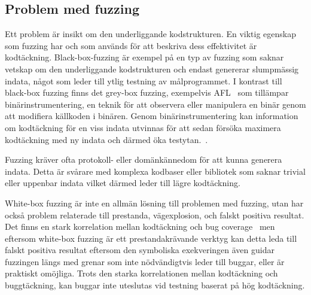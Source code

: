 \subsection{Problem med fuzzing} Ett problem är insikt om den underliggande
kodstrukturen. En viktig egenskap som fuzzing har och som används för att beskriva dess
effektivitet är kodtäckning. Black-box-fuzzing är exempel på en typ av fuzzing som
saknar vetskap om den underliggande kodstrukturen och endast genererar
slumpmässig indata, något som leder till ytlig testning av målprogrammet. I
kontrast till black-box fuzzing finns det grey-box fuzzing, exempelvis
AFL~\cite{aflplusplus} som tillämpar binärinstrumentering, en
teknik för att observera eller manipulera en binär genom att modifiera källkoden
i binären. Genom binärinstrumentering kan information om kodtäckning
för en viss indata utvinnas för att sedan försöka maximera kodtäckning med ny indata
och därmed öka testytan.~\cite{challenges_fuzzing}.


Fuzzing kräver ofta protokoll- eller domänkännedom för att kunna generera
indata. Detta är svårare med komplexa kodbaser eller bibliotek som saknar
trivial eller uppenbar indata vilket därmed leder till lägre kodtäckning.

White-box fuzzing är inte en allmän lösning till problemen med fuzzing, utan
har också problem relaterade till prestanda, vägexplosion, och falskt positiva
resultat. Det finns en stark korrelation mellan kodtäckning och bug
coverage~\cite{directed_greybox_fuzzing} men eftersom white-box fuzzing är ett
prestandakrävande verktyg kan detta leda till falskt positiva resultat eftersom den
symboliska exekveringen även guidar fuzzingen längs med grenar som
inte nödvändigtvis leder till buggar, eller är praktiskt omöjliga.
Trots den starka korrelationen mellan kodtäckning och buggtäckning, kan buggar inte uteslutas vid
testning baserat på hög kodtäckning.


